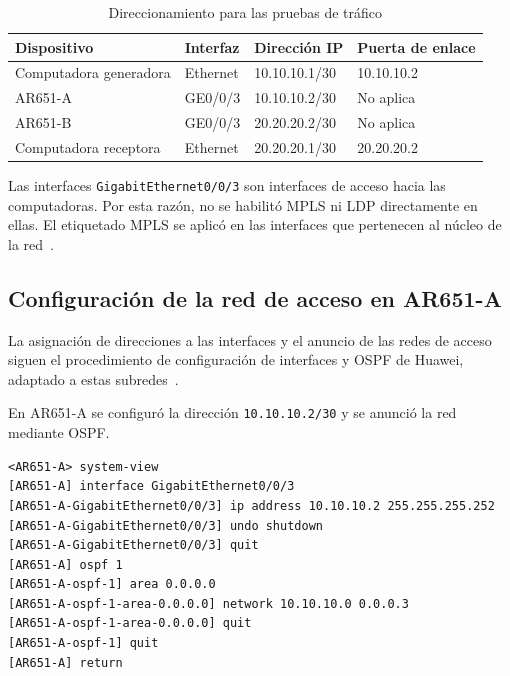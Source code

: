 \begin{table}[H]

    \centering

    \caption{Direccionamiento para las pruebas de tráfico}

    \label{tab:direccionamiento-iperf3}

    \begin{tabular}{|p{3.5cm}|p{2.5cm}|p{3.1cm}|p{3.4cm}|}

        \hline

        \textbf{Dispositivo} & \textbf{Interfaz} & \textbf{Dirección IP} & \textbf{Puerta de enlace} \\ \hline

        Computadora generadora & Ethernet & 10.10.10.1/30 & 10.10.10.2 \\ \hline

        AR651-A & GE0/0/3 & 10.10.10.2/30 & No aplica \\ \hline

        AR651-B & GE0/0/3 & 20.20.20.2/30 & No aplica \\ \hline

        Computadora receptora & Ethernet & 20.20.20.1/30 & 20.20.20.2 \\ \hline

    \end{tabular}

\end{table}

Las interfaces \texttt{GigabitEthernet0/0/3} son interfaces de acceso hacia
las computadoras. Por esta razón, no se habilitó MPLS ni LDP directamente en
ellas. El etiquetado MPLS se aplicó en las interfaces que pertenecen al núcleo
de la red~\cite[tarea~2.2]{guia-mpls-ar651-s6730h}.

\subsection{Configuración de la red de acceso en AR651-A}

La asignación de direcciones a las interfaces y el anuncio de las redes de
acceso siguen el procedimiento de configuración de interfaces y OSPF de
Huawei, adaptado a estas subredes~\cite[sec.~1.4.2, pasos~1--2]{huawei-om-automatico}.

En AR651-A se configuró la dirección \texttt{10.10.10.2/30} y se anunció
la red mediante OSPF.

\begin{lstlisting}[style=terminal]
<AR651-A> system-view
[AR651-A] interface GigabitEthernet0/0/3
[AR651-A-GigabitEthernet0/0/3] ip address 10.10.10.2 255.255.255.252
[AR651-A-GigabitEthernet0/0/3] undo shutdown
[AR651-A-GigabitEthernet0/0/3] quit
[AR651-A] ospf 1
[AR651-A-ospf-1] area 0.0.0.0
[AR651-A-ospf-1-area-0.0.0.0] network 10.10.10.0 0.0.0.3
[AR651-A-ospf-1-area-0.0.0.0] quit
[AR651-A-ospf-1] quit
[AR651-A] return
\end{lstlisting}

